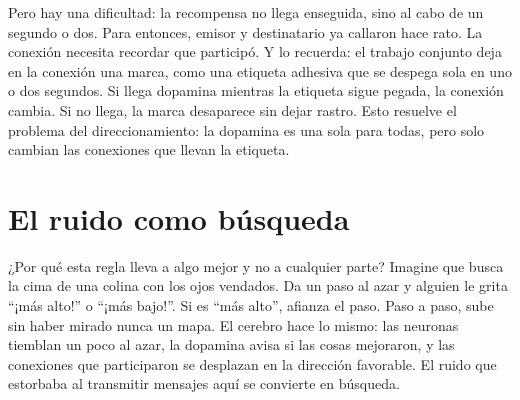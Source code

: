 Pero hay una dificultad: la recompensa no llega enseguida, sino al cabo de un segundo o dos. Para entonces, emisor y destinatario ya callaron hace rato. La conexión necesita recordar que participó. Y lo recuerda: el trabajo conjunto deja en la conexión una marca, como una etiqueta adhesiva que se despega sola en uno o dos segundos. Si llega dopamina mientras la etiqueta sigue pegada, la conexión cambia. Si no llega, la marca desaparece sin dejar rastro. Esto resuelve el problema del direccionamiento: la dopamina es una sola para todas, pero solo cambian las conexiones que llevan la etiqueta.


\section*{El ruido como búsqueda}

¿Por qué esta regla lleva a algo mejor y no a cualquier parte? Imagine que busca la cima de una colina con los ojos vendados. Da un paso al azar y alguien le grita “¡más alto!” o “¡más bajo!”. Si es “más alto”, afianza el paso. Paso a paso, sube sin haber mirado nunca un mapa. El cerebro hace lo mismo: las neuronas tiemblan un poco al azar, la dopamina avisa si las cosas mejoraron, y las conexiones que participaron se desplazan en la dirección favorable. El ruido que estorbaba al transmitir mensajes aquí se convierte en búsqueda.

